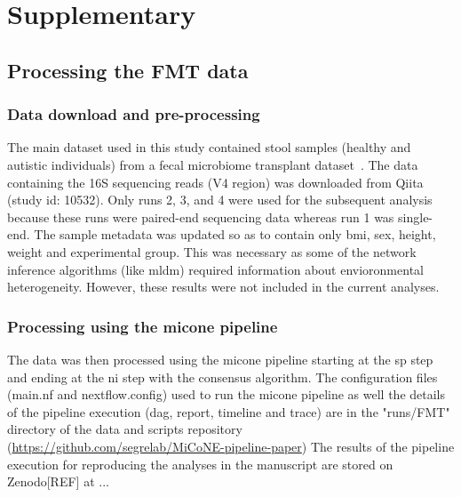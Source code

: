 
\newpage
\section*{Supplementary}

  \renewcommand{\thefigure}{S\arabic{figure}}
  \setcounter{figure}{0}

  \renewcommand{\thetable}{S\arabic{table}}
  \setcounter{table}{0}

  

  \subsection*{Processing the FMT data}

    \subsubsection*{Data download and pre-processing}
    The main dataset used in this study contained stool samples (healthy and autistic individuals) from a fecal microbiome transplant dataset~\cite{Kang2017}.
    The data containing the 16S sequencing reads (V4 region) was downloaded from Qiita~\cite{qiita} (study id: 10532).
    Only runs 2, 3, and 4 were used for the subsequent analysis because these runs were paired-end sequencing data whereas run 1 was single-end.
    The sample metadata was updated so as to contain only bmi, sex, height, weight and experimental group.
    This was necessary as some of the network inference algorithms (like \ac{mldm}) required information about envioronmental heterogeneity.
    However, these results were not included in the current analyses.

    \subsubsection*{Processing using the \ac{micone} pipeline}
    The data was then processed using the \ac{micone} pipeline starting at the \ac{sp} step and ending at the \ac{ni} step with the consensus algorithm.
    The configuration files (main.nf and nextflow.config) used to run the \ac{micone} pipeline as well the details of the pipeline execution (dag, report, timeline and trace) are in the "runs/FMT" directory of the data and scripts repository (\href{https://github.com/segrelab/MiCoNE-pipeline-paper}{https://github.com/segrelab/MiCoNE-pipeline-paper})
    The results of the pipeline execution for reproducing the analyses in the manuscript are stored on Zenodo[REF] at ...

